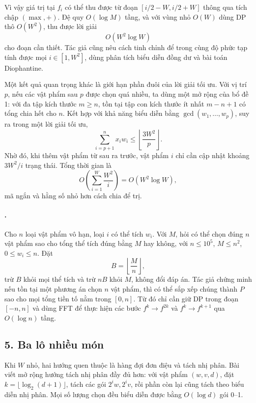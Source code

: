 \documentclass[11pt]{article}
\begin{document}
Vì vậy giá trị tại \(f_i\) có thể thu được từ đoạn
\([i/2-W,i/2+W]\) thông qua tích chập \((\max,+)\). Đệ quy \(O(\log M)\) tầng,
và với vùng nhỏ \(O(W)\) dùng DP thô \(O(W^2)\), thu được lời giải
\[
  O(W^2\log W)
\]
cho đoạn cần thiết. Tác giả cũng nêu cách tinh chỉnh để trong cùng độ phức tạp
tính được mọi \(i\in[1,W^2]\), dùng phân tích biểu diễn đồng dư và bài toán
Diophantine.

Một kết quả quan trọng khác là giới hạn phần đuôi của lời giải tối ưu. Với
vị trí \(p\), nếu các vật phẩm sau \(p\) được chọn quá nhiều, ta dùng một mở
rộng của bổ đề 1: với đa tập kích thước \(m\ge n\), tồn tại tập con kích thước
ít nhất \(m-n+1\) có tổng chia hết cho \(n\). Kết hợp với khả năng biểu diễn
bằng \(\gcd(w_1,\ldots,w_p)\), suy ra trong một lời giải tối ưu,
\[
  \sum_{i=p+1}^{n} x_iw_i\le \left\lfloor\frac{3W^2}{p}\right\rfloor.
\]
Nhờ đó, khi thêm vật phẩm từ sau ra trước, vật phẩm \(i\) chỉ cần cập nhật
khoảng \(3W^2/i\) trạng thái. Tổng thời gian là
\[
  O\left(\sum_{i=1}^{W} \frac{W^2}{i}\right)=O(W^2\log W),
\]
mã ngắn và hằng số nhỏ hơn cách chia để trị.

\paragraph{.}
Cho \(n\) loại vật phẩm vô hạn, loại \(i\) có thể tích \(w_i\). Với \(M\), hỏi
có thể chọn đúng \(n\) vật phẩm sao cho tổng thể tích đúng bằng \(M\) hay
không, với \(n\le 10^5\), \(M\le n^2\), \(0\le w_i\le n\). Đặt
\[
  B=\left\lfloor\frac{M}{n}\right\rfloor,
\]
trừ \(B\) khỏi mọi thể tích và trừ \(nB\) khỏi \(M\), không đổi đáp án. Tác giả
chứng minh nếu tồn tại một phương án chọn \(n\) vật phẩm, thì có thể sắp xếp
chúng thành \(P\) sao cho mọi tổng tiền tố nằm trong \([0,n]\). Từ đó chỉ cần
giữ DP trong đoạn \([-n,n]\) và dùng FFT để thực hiện các bước \(f^k\to f^{2k}\)
và \(f^k\to f^{k+1}\) qua \(O(\log n)\) tầng.

\subsection*{5. Ba lô nhiều món}

Khi \(W\) nhỏ, hai hướng quen thuộc là hàng đợi đơn điệu và tách nhị phân.
Bài viết mở rộng hướng tách nhị phân đầy đủ hơn: với vật phẩm \((w,v,d)\), đặt
\(k=\lfloor\log_2(d+1)\rfloor\), tách các gói \(2^iw,2^iv\), rồi phần còn lại
cũng tách theo biểu diễn nhị phân. Mọi số lượng chọn đều biểu diễn được bằng
\(O(\log d)\) gói 0--1.
\end{document}
